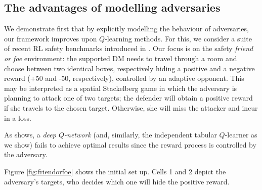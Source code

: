 

\subsection{The advantages of modelling adversaries}\label{s:sg}

We demonstrate first that  by
explicitly modelling the behaviour of adversaries, 
our framework improves upon $Q$-learning methods. 
For this, we consider a suite of recent RL safety benchmarks
 introduced in \cite{leike2017ai}.
Our focus is 
on the safety \emph{friend or foe} environment:
the supported DM
needs to travel through a room and choose 
between two identical boxes, respectively hiding a positive
and a negative reward (+50 and -50, respectively), controlled by
an adaptive opponent.
This may be interpreted as a spatial Stackelberg game in which
the adversary is planning to attack one of two targets; the defender
will obtain a positive reward if she travels to the chosen target. Otherwise,
she will miss the attacker and incur in a loss.

As \cite{leike2017ai} shows, a \emph{deep $Q$-network}
(and, similarly, the independent tabular $Q$-learner as we show) fails to
achieve optimal results since the reward process is controlled by the adversary.

Figure \ref{fig:friendorfoe} shows the initial set up. 
Cells 1 and 2 depict the adversary's targets, who decides which 
one will 
hide the positive reward.

